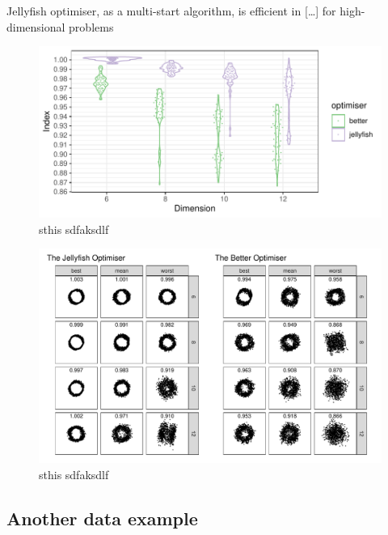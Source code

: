 \documentclass[
  number,
  preprint,
  3p]{elsarticle}
\begin{document}
Jellyfish optimiser, as a multi-start algorithm, is efficient in
{[}\ldots{]} for high-dimensional problems

\begin{figure}[H]

{\centering \includegraphics{optim_files/figure-pdf/unnamed-chunk-7-1.pdf}

}

\caption{sthis sdfaksdlf}

\end{figure}%

\begin{figure}[H]

{\centering \includegraphics{optim_files/figure-pdf/unnamed-chunk-8-1.pdf}

}

\caption{sthis sdfaksdlf}

\end{figure}%

\newpage

\subsection{Another data example}\label{another-data-example}
\end{document}
